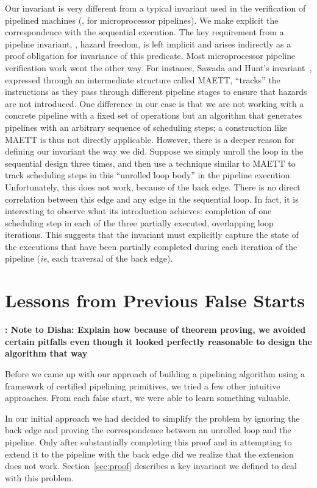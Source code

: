 Our invariant is very different from a typical invariant
used in the verification of pipelined machines (\eg, for
microprocessor pipelines).  We make explicit the
correspondence with the sequential execution.  The key
requirement from a pipeline invariant, \viz, hazard freedom,
is left implicit and arises indirectly as a proof obligation
for invariance of this predicate.  Most microprocessor
pipeline verification work went the other way.  For
instance, Sawada and Hunt's invariant~\cite{sh:pipeline},
expressed through an intermediate structure called MAETT,
``tracks'' the instructions as they pass through different
pipeline stages to ensure that hazards are not introduced.
One difference in our case is that we are not working with a
concrete pipeline with a fixed set of operations but an
algorithm that generates pipelines with an arbitrary
sequence of scheduling steps; a construction like MAETT is
thus not directly applicable.  However, there is a deeper
reason for defining our invariant the way we did.
Suppose we simply unroll the loop in the sequential
design three times, and then use a technique similar to
MAETT to track scheduling steps in this ``unrolled loop
body'' in the pipeline execution.  Unfortunately, this does
not work, because of the back edge.  There is no direct
correlation between this edge and any edge in the sequential
loop.  In fact, it is interesting to observe what its
introduction achieves: completion of one scheduling step in
each of the three partially executed, overlapping loop
iterations.  This suggests that the invariant must
explicitly capture the state of the executions that have
been partially completed during each iteration of the
pipeline ({\em ie}, each traversal of the back edge).



\section{Lessons from Previous False Starts}

{\bf: Note to Disha: Explain how because of theorem proving, we avoided certain pitfalls even though it looked perfectly reasonable to design the algorithm that way}

Before we came up with our approach of building a pipelining
algorithm using a framework of certified pipelining primitives,
we tried a few other intuitive approaches.
From each false start, we were able to learn something valuable.

In our initial approach we had decided to simplify the problem
by ignoring the back edge and proving the correspondence
between an unrolled loop and the pipeline.
Only after substantially completing this proof and in
attempting to extend it to the pipeline with the back edge
did we realize that the extension does not work. Section~\ref{sec:proof} describes a key
invariant we defined to deal with this problem.

